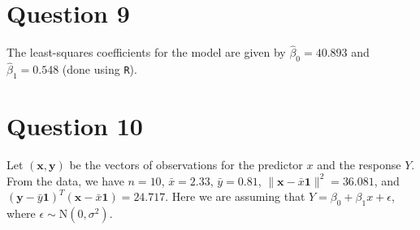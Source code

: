\documentclass[10pt]{article}
\begin{document}
\section{Question 9} \noindent
The least-squares coefficients for the model are given by \(\hat{\beta}_0 = 40.893\) and \(\hat{\beta}_1 = 0.548\) (done using \texttt{R}).

\section{Question 10} \noindent
Let \((\mathbf{x}, \mathbf{y})\) be the vectors of observations for the predictor \(x\) and the response \(Y\). 
From the data, we have \(n = 10\), \(\bar{x} = 2.33\), \(\bar{y} = 0.81\), \(\| \mathbf{x} - \bar{x}\mathbf{1} \|^2 = 36.081\), and 
\((\mathbf{y} - \bar{y}\mathbf{1})^T(\mathbf{x} - \bar{x}\mathbf{1}) = 24.717\).
Here we are assuming that \(Y = \beta_0 + \beta_1 x + \epsilon\), where \(\epsilon \sim \mathrm{N}(0, \sigma^2)\).
\end{document}
